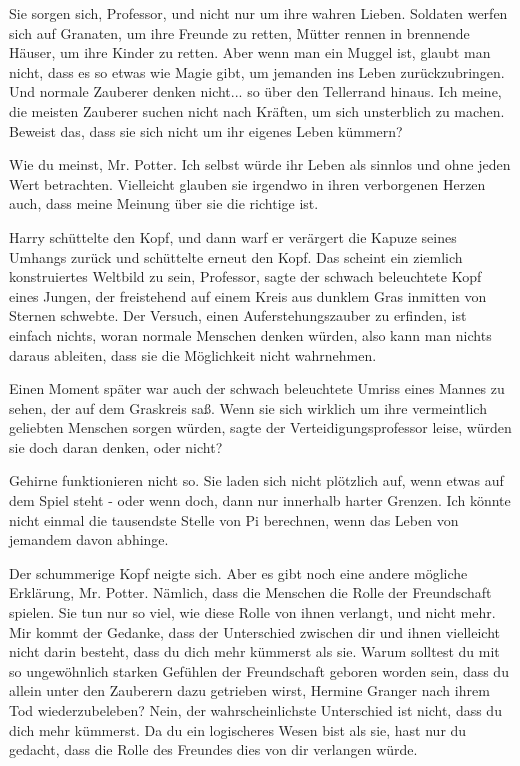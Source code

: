 \glqq{}Sie sorgen sich, Professor, und nicht nur um ihre wahren Lieben. Soldaten
werfen sich auf Granaten, um ihre Freunde zu retten, Mütter rennen in brennende
Häuser, um ihre Kinder zu retten. Aber wenn man ein Muggel ist, glaubt man
nicht, dass es so etwas wie Magie gibt, um jemanden ins Leben zurückzubringen.
Und normale Zauberer denken nicht... so über den Tellerrand hinaus. Ich meine,
die meisten Zauberer suchen nicht nach Kräften, um sich unsterblich zu machen.
Beweist das, dass sie sich nicht um ihr eigenes Leben kümmern?\grqq{}

\glqq{}Wie du meinst, Mr. Potter. Ich selbst würde ihr Leben als sinnlos und ohne
jeden Wert betrachten. Vielleicht glauben sie irgendwo in ihren verborgenen
Herzen auch, dass meine Meinung über sie die richtige ist.\grqq{}

Harry schüttelte den Kopf, und dann warf er verärgert die Kapuze seines Umhangs
zurück und schüttelte erneut den Kopf. \glqq{}Das scheint ein ziemlich
konstruiertes Weltbild zu sein, Professor\grqq{}, sagte der schwach beleuchtete
Kopf eines Jungen, der freistehend auf einem Kreis aus dunklem Gras inmitten von
Sternen schwebte. \glqq{}Der Versuch, einen Auferstehungszauber zu erfinden, ist
einfach nichts, woran normale Menschen denken würden, also kann man nichts
daraus ableiten, dass sie die Möglichkeit nicht wahrnehmen.\grqq{}

Einen Moment später war auch der schwach beleuchtete Umriss eines Mannes zu
sehen, der auf dem Graskreis saß. \glqq{}Wenn sie sich wirklich um ihre
vermeintlich geliebten Menschen sorgen würden\grqq{}, sagte der
Verteidigungsprofessor leise, \glqq{}würden sie doch daran denken, oder
nicht?\grqq{}

\glqq{}Gehirne funktionieren nicht so. Sie laden sich nicht plötzlich auf, wenn
etwas auf dem Spiel steht - oder wenn doch, dann nur innerhalb harter Grenzen.
Ich könnte nicht einmal die tausendste Stelle von Pi berechnen, wenn das Leben
von jemandem davon abhinge.\grqq{}

Der schummerige Kopf neigte sich. \glqq{}Aber es gibt noch eine andere mögliche
Erklärung, Mr. Potter. Nämlich, dass die Menschen die Rolle der Freundschaft
spielen. Sie tun nur so viel, wie diese Rolle von ihnen verlangt, und nicht
mehr. Mir kommt der Gedanke, dass der Unterschied zwischen dir und ihnen
vielleicht nicht darin besteht, dass du dich mehr kümmerst als sie. Warum
solltest du mit so ungewöhnlich starken Gefühlen der Freundschaft geboren worden
sein, dass du allein unter den Zauberern dazu getrieben wirst, Hermine Granger
nach ihrem Tod wiederzubeleben? Nein, der wahrscheinlichste Unterschied ist
nicht, dass du dich mehr kümmerst. Da du ein logischeres Wesen bist als sie,
hast nur du gedacht, dass die Rolle des Freundes dies von dir verlangen
würde.\grqq{}

